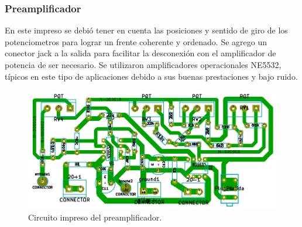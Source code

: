 \subsubsection{Preamplificador}
\medskip
En este impreso se debió tener en cuenta las posiciones y sentido de giro de los potenciometros para lograr un frente coherente y ordenado. Se agrego un conector jack a la salida para facilitar la desconexión con el amplificador de potencia de ser necesario.
Se utilizaron amplificadores operacionales NE5532, típicos en este tipo de aplicaciones debido a sus buenas prestaciones y bajo ruido.

\begin{figure}[H]
\centering
\centerline{\includegraphics[width=1\textwidth]{img/pre_pcb.png}}
\caption{Circuito impreso del preamplificador.}
\label{pre_pcb} 
\end{figure}